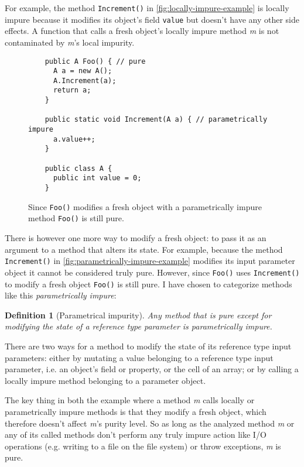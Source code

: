 \documentclass[a4paper,12pt]{article}
\newtheorem{definition}{Definition} %
\begin{document}
For example, the method \texttt{Increment()} in \autoref{fig:locally-impure-example} is locally impure because it modifies its object's field \texttt{value} but doesn't have any other side effects. A function that calls a fresh object's locally impure method \textit{m} is not contaminated by \textit{m}'s local impurity.

\begin{figure}
  \centering
  \begin{lstlisting}
    public A Foo() { // pure
      A a = new A();
      A.Increment(a);
      return a;
    }

    public static void Increment(A a) { // parametrically impure
      a.value++;
    }

    public class A {
      public int value = 0;
    }
  \end{lstlisting}
  \caption{Since \texttt{Foo()} modifies a fresh object with a parametrically impure method \texttt{Foo()} is still pure.}
  \label{fig:parametrically-impure-example}
\end{figure}

There is however one more way to modify a fresh object: to pass it as an argument to a method that alters its state. For example, because the method \texttt{Increment()} in \autoref{fig:parametrically-impure-example} modifies its input parameter object it cannot be considered truly pure. However, since \texttt{Foo()} uses \texttt{Increment()} to modify a fresh object \texttt{Foo()} is still pure. I have chosen to categorize methods like this \textit{parametrically impure}:

\begin{definition}[Parametrical impurity] \label{def:parametrically-impure}
  Any method that is pure except for modifying the state of a reference type parameter is parametrically impure.
\end{definition}

There are two ways for a method to modify the state of its reference type input parameters: either by mutating a value belonging to a reference type input parameter, i.e. an object's field or property, or the cell of an array; or by calling a locally impure method belonging to a parameter object.

The key thing in both the example where a method \textit{m} calls locally or parametrically impure methods is that they modify a fresh object, which therefore doesn't affect \textit{m}'s purity level. So as long as the analyzed method \textit{m} or any of its called methods don't perform any truly impure action like I/O operations (e.g. writing to a file on the file system) or throw exceptions, \textit{m} is pure.
\end{document}
